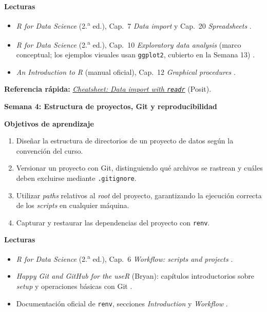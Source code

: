 \documentclass[11pt,letterpaper]{article}
\newcommand{\semana}[2]{%
  \bigskip%
  {\color{main}\Large\bfseries Semana #1: #2\par}%
  \smallskip%
}
\newcommand{\cheatsheet}[2]{%
  \href{https://rstudio.github.io/cheatsheets/#1.pdf}{\textit{Cheatsheet: #2}}%
}
\begin{document}
\medskip
\noindent\textbf{Lecturas}
\begin{itemize}[leftmargin=*, itemsep=1pt]
    \item \textit{R for Data Science} (2.\textsuperscript{a} ed.), Cap.\ 7 \textit{Data import} y Cap.\ 20 \textit{Spreadsheets} \cite{wickham2023r4ds}.
    \item \textit{R for Data Science} (2.\textsuperscript{a} ed.), Cap.\ 10 \textit{Exploratory data analysis} (marco conceptual; los ejemplos visuales usan \texttt{ggplot2}, cubierto en la Semana 13) \cite{wickham2023r4ds}.
    \item \textit{An Introduction to R} (manual oficial), Cap.\ 12 \textit{Graphical procedures} \cite{rcoreteam-intro}.
\end{itemize}

\medskip
\noindent\textbf{Referencia rápida:} \cheatsheet{data-import}{Data import with \texttt{readr}} (Posit).

\semana{4}{Estructura de proyectos, Git y reproducibilidad}

\medskip
\noindent\textbf{Objetivos de aprendizaje}
\begin{enumerate}[leftmargin=*, itemsep=1pt]
    \item Diseñar la estructura de directorios de un proyecto de datos según la convención del curso.
    \item Versionar un proyecto con Git, distinguiendo qué archivos se rastrean y cuáles deben excluirse mediante \texttt{.gitignore}.
    \item Utilizar \textit{paths} relativos al \textit{root} del proyecto, garantizando la ejecución correcta de los \textit{scripts} en cualquier máquina.
    \item Capturar y restaurar las dependencias del proyecto con \texttt{renv}.
\end{enumerate}

\medskip
\noindent\textbf{Lecturas}
\begin{itemize}[leftmargin=*, itemsep=1pt]
    \item \textit{R for Data Science} (2.\textsuperscript{a} ed.), Cap.\ 6 \textit{Workflow: scripts and projects} \cite{wickham2023r4ds}.
    \item \textit{Happy Git and GitHub for the useR} (Bryan): capítulos introductorios sobre \textit{setup} y operaciones básicas con Git \cite{bryan-happygit}.
    \item Documentación oficial de \texttt{renv}, secciones \textit{Introduction} y \textit{Workflow} \cite{ushey-renv}.
\end{itemize}
\end{document}
